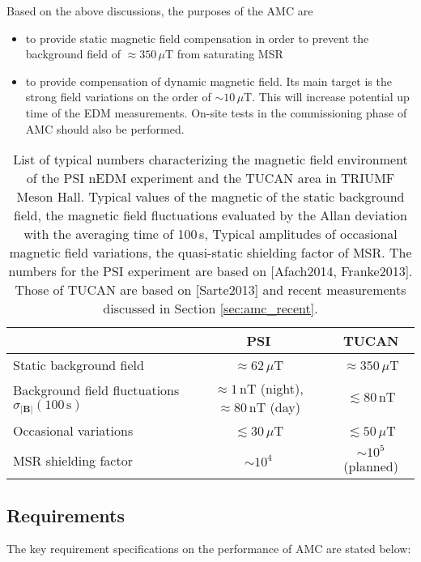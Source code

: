 Based on the above discussions, the purposes of the AMC are 
\begin{itemize}
    \item to provide static magnetic field compensation in order to prevent the background field of $\approx 350\,\mu$T from saturating MSR 
    \item to provide compensation of dynamic magnetic field. Its main target is the strong field variations on the order of $\sim 10\,\mu$T. This will increase potential up time of the EDM measurements. On-site tests in the commissioning phase of AMC should also be performed.
\end{itemize}

\begin{table}[hbt]
\centering 
\begin{tabular}{|l||c|c|}
\hline

 & \multicolumn{1}{c|}{\textbf{PSI}} & \multicolumn{1}{c|}{\textbf{TUCAN}} \\ \hline\hline 
Static background field  & $\approx62\,\mu$T & $\approx 350\,\mu$T                       \\ \hline
Background field fluctuations  $\sigma_{|\mathbf{B}|}(100\,\mathrm{s})$ & $\approx 1\,\mathrm{nT}$ (night), $\approx 80\,\mathrm{nT}$ (day) & $\lesssim 80\,\mathrm{nT}$ \\ \hline
Occasional variations    & $\lesssim30\,\mu$T   & $\lesssim 50\,\mu$T            \\ \hline
 MSR shielding  factor       &    $\sim 10^4$   &   $\sim 10^5$ (planned)  \\ \hline 
\end{tabular}
\caption{List of typical numbers characterizing the magnetic field environment of the PSI nEDM experiment and the TUCAN area in TRIUMF Meson Hall. Typical values of the magnetic of the static background field, the magnetic field fluctuations evaluated by the Allan deviation with the averaging time of 100\,s, Typical amplitudes of occasional magnetic field variations, the quasi-static shielding factor of MSR. The numbers for the PSI experiment are based on [Afach2014, Franke2013]. Those of TUCAN are based on [Sarte2013] and recent measurements discussed in Section \ref{sec:amc_recent}. 
}
\label{tab:amc_comparaion}
\end{table}


\subsection{Requirements}
The key requirement specifications on the performance of AMC are stated below:

